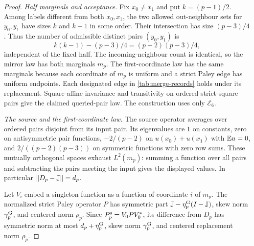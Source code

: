 \begin{proof}
\emph{Half marginals and acceptance.}
Fix $x_0\ne x_1$ and put $k=(p-1)/2$. Among labels different from both
$x_0,x_1$, the two allowed out-neighbour sets for $y_0,y_1$ have sizes
$k$ and $k-1$ in some order. Their intersection has size $(p-3)/4$.
Thus the number of admissible distinct pairs $(y_0,y_1)$ is
\[
 k(k-1)-(p-3)/4=(p-2)(p-3)/4,
\]
independent of the fixed half. The incoming-neighbour count is identical,
so the mirror law has both marginals $m_p$. The first-coordinate law has
the same marginals because each coordinate of $m_p$ is uniform and a
strict Paley edge has uniform endpoints. Each designated edge in
\cref{tab:merge-records} holds under its replacement. Square-affine
invariance and transitivity on ordered strict-square pairs give the
claimed queried-pair law. The construction uses only $\mathcal E_6$.

\emph{The source and the first-coordinate law.}
The source operator averages over ordered pairs disjoint from its input
pair. Its eigenvalues are $1$ on constants, zero on antisymmetric pair
functions, $-2/(p-2)$ on $u(x_0)+u(x_1)$ with $\mathbb E u=0$, and
$2/((p-2)(p-3))$ on symmetric functions with zero row sums. These mutually
orthogonal spaces exhaust $L^2(m_p)$: summing a function over all pairs
and subtracting the pairs meeting the input gives the displayed values.
In particular $\|D_p-\mathbb J\|=d_p$.

Let $V_i$ embed a singleton function as a function of coordinate $i$ of
$m_p$. The normalized strict Paley operator $P$ has symmetric part
$\mathbb J-\eta^{\rm G}_p(I-\mathbb J)$, skew norm $\gamma^{\rm G}_p$, and centered norm
$\rho_p$. Since $P_p^{\rm s}=V_0PV_0^*$, its difference from $D_p$ has
symmetric norm at most $d_p+\eta^{\rm G}_p$, skew norm $\gamma^{\rm G}_p$, and centered
replacement norm $\rho_p$.


\end{proof}

